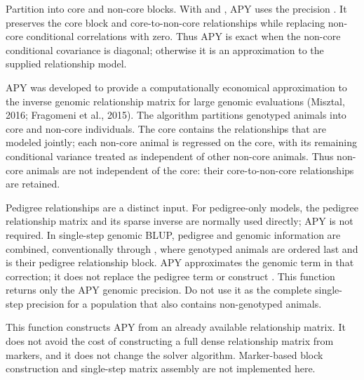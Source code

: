 \documentclass[a4paper]{book}
\begin{document}
%
\begin{Details}\relax
Partition  into core and non-core blocks. With
 and
, APY uses the precision
\eqn{\left[\begin{smallmatrix}
G_{cc}^{-1} + B' D^{-1} B & -B' D^{-1} \\
-D^{-1} B & D^{-1}
\end{smallmatrix}\right]}{}. It preserves the core block and core-to-non-core
relationships while replacing non-core conditional correlations with zero.
Thus APY is exact when the non-core conditional covariance is diagonal;
otherwise it is an approximation to the supplied relationship model.

APY was developed to provide a computationally economical approximation to
the inverse genomic relationship matrix for large genomic evaluations
(Misztal, 2016; Fragomeni et al., 2015). The algorithm partitions genotyped
animals into core and non-core individuals. The core contains the relationships
that are modeled jointly; each non-core animal is regressed on the core, with
its remaining conditional variance treated as independent of other non-core
animals. Thus non-core animals are not independent of the core: their
core-to-non-core relationships are retained.

Pedigree relationships are a distinct input. For pedigree-only models, the
pedigree relationship matrix  and its sparse inverse  are
normally used directly; APY is not required. In single-step genomic BLUP,
pedigree and genomic information are combined, conventionally through
,
where genotyped animals are ordered last and  is their pedigree
relationship block. APY approximates the genomic term  in that
correction; it does not replace the pedigree term or construct .
This function returns only the APY genomic precision. Do not use it as the
complete single-step precision for a population that also contains
non-genotyped animals.

This function constructs APY from an already available relationship matrix. It
does not avoid the cost of constructing a full dense relationship matrix from
markers, and it does not change the solver algorithm. Marker-based block
construction and single-step matrix assembly are not implemented here.
\end{Details}
\end{document}
